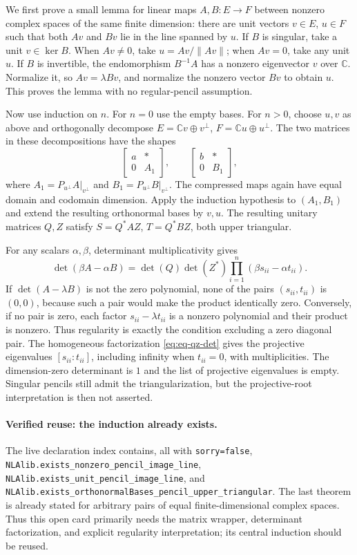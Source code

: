 \documentclass[11pt,a4paper]{article}
\newcommand{\C}{\mathbb C}
\DeclareRobustCommand{\code}[1]{{\footnotesize\urlstyle{tt}\nolinkurl{#1}}}
\begin{document}
We first prove a small lemma for linear maps $A,B:E\to F$ between
nonzero complex spaces of the same finite dimension: there are unit
vectors $v\in E$, $u\in F$ such that both $Av$ and $Bv$ lie in the
line spanned by $u$.
If $B$ is singular, take a unit $v\in\ker B$. When $Av\ne0$, take
$u=Av/\|Av\|$; when $Av=0$, take any unit $u$. If $B$ is invertible,
the endomorphism $B^{-1}A$ has a nonzero eigenvector $v$ over $\C$.
Normalize it, so $Av=\lambda Bv$, and normalize the nonzero vector
$Bv$ to obtain $u$. This proves the lemma with no regular-pencil
assumption.

Now use induction on $n$. For $n=0$ use the empty bases. For $n>0$,
choose $u,v$ as above and orthogonally decompose
$E=\mathbb Cv\oplus v^\perp$, $F=\mathbb Cu\oplus u^\perp$.
The two matrices in these decompositions have the shapes
\[
 \begin{bmatrix}a&*\\0&A_1\end{bmatrix},\qquad
 \begin{bmatrix}b&*\\0&B_1\end{bmatrix},
\]
where $A_1=P_{u^\perp}A|_{v^\perp}$ and
$B_1=P_{u^\perp}B|_{v^\perp}$. The compressed maps again have equal
domain and codomain dimension. Apply the induction hypothesis to
$(A_1,B_1)$ and extend the resulting orthonormal bases by $v,u$.
The resulting unitary matrices $Q,Z$ satisfy
$S=Q^*AZ$, $T=Q^*BZ$, both upper triangular.

For any scalars $\alpha,\beta$, determinant multiplicativity gives
\begin{equation}\label{eq:eq-qz-det}
 \det(\beta A-\alpha B)
 =\det(Q)\det(Z^*)\prod_{i=1}^n(\beta s_{ii}-\alpha t_{ii}).
\end{equation}
If $\det(A-\lambda B)$ is not the zero polynomial, none of the pairs
$(s_{ii},t_{ii})$ is $(0,0)$, because such a pair would make the product
identically zero. Conversely, if no pair is zero, each factor
$s_{ii}-\lambda t_{ii}$ is a nonzero polynomial and their product is
nonzero. Thus regularity is exactly the condition excluding a zero
diagonal pair. The homogeneous factorization
\eqref{eq:eq-qz-det} gives the projective eigenvalues
$[s_{ii}:t_{ii}]$, including infinity when $t_{ii}=0$, with
multiplicities. The dimension-zero determinant is $1$ and the list of
projective eigenvalues is empty. Singular pencils still admit the
triangularization, but the projective-root interpretation is then not
asserted.

\paragraph{Verified reuse: the induction already exists.}
The live declaration index contains, all with \code{sorry=false},
\code{NLAlib.exists_nonzero_pencil_image_line},
\code{NLAlib.exists_unit_pencil_image_line}, and
\code{NLAlib.exists_orthonormalBases_pencil_upper_triangular}.
The last theorem is already stated for arbitrary pairs of equal
finite-dimensional complex spaces. Thus this open card primarily needs
the matrix wrapper, determinant factorization, and explicit regularity
interpretation; its central induction should be reused.
\end{document}
